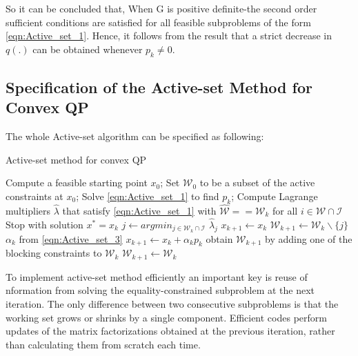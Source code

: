 So it can be concluded that, When G is positive definite-the second order sufficient conditions are satisfied for all feasible subproblems of the form \ref{eqn:Active_set_1}. Hence, it follows from the result that a strict decrease in $q(.)$ can be obtained whenever $p_k \neq 0$.

\subsection*{Specification of the Active-set Method for Convex QP}
The whole Active-set algorithm can be specified as following:
\begin{algorithm}[h]
  \caption{Active-set method for convex QP}\label{euclid}
  \begin{algorithmic}[1]
      \State Compute a feasible starting point $x_0$;
      \State Set $\mathcal{W}_0$ to be a subset of the active constraints at $x_0$;
        \State Solve \ref{eqn:Active_set_1} to find $p_k$;
          \State Compute Lagrange multipliers $\hat{\lambda}$ that satisfy \ref{eqn:Active_set_1} with $\hat{\mathcal{W}}==\mathcal{W}_k$
           for all $i \in \mathcal{W}\cap \mathcal{I}$
          	\State Stop with solution $x^* = x_k$
          \Else
          	\State $j \gets argmin_{j\in \mathcal{W}_k \cap \mathcal{I}}$ $\hat{\lambda}_j$
          	\State $x_{k+1} \gets x_k$
          	\State $\mathcal{W}_{k+1} \gets \mathcal{W}_k\backslash \lbrace{j \rbrace}$
          \EndIf 
        \Else
          \State $\alpha_k$ from \ref{eqn:Active_set_3}
          \State $x_{k+1} \gets x_k + \alpha_kp_k$
          	\State obtain $\mathcal{W}_{k+1}$ by adding one of the blocking constraints to $\mathcal{W}_k$
          \Else
          	\State $\mathcal{W}_{k+1} \gets \mathcal{W}_k$  
          \EndIf
        \EndIf
      \EndFor
    \EndProcedure
  \end{algorithmic}
\end{algorithm}

To implement active-set method efficiently an important key is reuse of nformation from solving the equality-constrained subproblem at the next iteration. The only difference between two consecutive subproblems is that the working set grows or shrinks by a single component. Efficient codes perform updates of the matrix factorizations obtained at the previous iteration, rather than calculating them from scratch each time.



